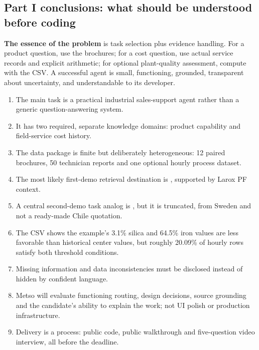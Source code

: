 \documentclass[11pt,a4paper]{article}
\DeclareRobustCommand{\code}[1]{{\ttfamily\small\detokenize{#1}}}
\begin{document}
\subsection{Part I conclusions: what should be understood before coding}
\begin{keybox}
\textbf{The essence of the problem} is task selection plus evidence handling. For a product question, use the brochures; for a cost question, use actual service records and explicit arithmetic; for optional plant-quality assessment, compute with the CSV. A successful agent is small, functioning, grounded, transparent about uncertainty, and understandable to its developer.
\end{keybox}
\begin{enumerate}
\item The main task is a practical industrial sales-support agent rather than a generic question-answering system.
\item It has two required, separate knowledge domains: product capability and field-service cost history.
\item The data package is finite but deliberately heterogeneous: 12 paired brochures, 50 technician reports and one optional hourly process dataset.
\item The most likely first-demo retrieval destination is \code{filter-optimizer.md}, supported by Larox PF context.
\item A central second-demo task analog is \code{FSR-0027.txt}, but it is truncated, from Sweden and not a ready-made Chile quotation.
\item The CSV shows the example's 3.1\% silica and 64.5\% iron values are less favorable than historical center values, but roughly 20.09\% of hourly rows satisfy both threshold conditions.
\item Missing information and data inconsistencies must be disclosed instead of hidden by confident language.
\item Metso will evaluate functioning routing, design decisions, source grounding and the candidate's ability to explain the work; not UI polish or production infrastructure.
\item Delivery is a process: public code, public walkthrough and five-question video interview, all before the deadline.
\end{enumerate}
\end{document}
